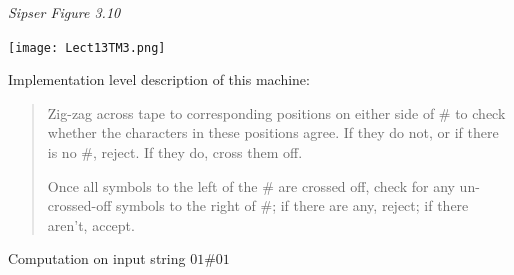 \documentclass[12pt, oneside]{article}
\begin{document}
\newpage
{\it Sipser Figure  3.10}

\begin{multicols}{2}
\vspace{-20pt}
\begin{center}
\texttt{[image: Lect13TM3.png]}
\end{center}

Implementation level description of this machine:
\begin{quote}
Zig-zag across tape to corresponding positions on either side of $\#$ to check whether the 
characters in these positions agree. If they do not, or if there is no $\#$, reject. If they 
do, cross them off.

Once all symbols to the left of the $\#$ are crossed off, check for any un-crossed-off symbols 
to the right of $\#$; if there are any, reject; if there aren't, accept.
\end{quote}

\columnbreak

Computation on  input  string  $01\#01$


\end{multicols}
\end{document}

